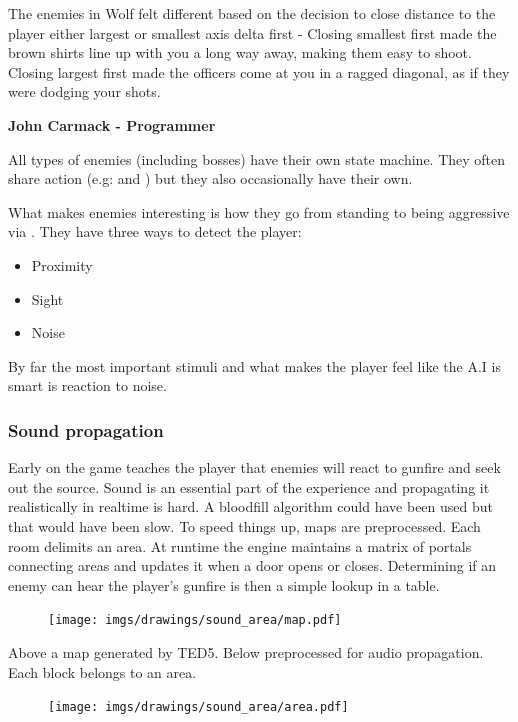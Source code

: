 \begin{fancyquotes}
The enemies in Wolf felt different based on the decision to close distance to the player either largest or smallest axis delta first - Closing smallest first made the brown shirts line up with you a long way away, making them easy to shoot.  Closing largest first made the officers come at you in a ragged diagonal, as if they were dodging your shots.\\
\par
\textbf{John Carmack - Programmer}
 \end{fancyquotes}
\par
All types of enemies (including bosses) have their own state machine. They often share action (e.g:  and ) but they also occasionally have their own.\\
\par
What makes enemies interesting is how they go from standing to being aggressive via . They have three ways to detect the player:
\begin{itemize}
\item Proximity
\item Sight
\item Noise
\end{itemize}
By far the most important stimuli and what makes the player feel like the A.I is smart is reaction to noise.





\subsubsection{Sound propagation}
Early on the game teaches the player that enemies will react to gunfire and seek out the source. Sound is an essential part of the experience and propagating it realistically in realtime is hard. A bloodfill algorithm could have been used but that would have been slow. To speed things up, maps are preprocessed. Each room delimits an area. At runtime the engine maintains a matrix of portals connecting areas and updates it when a door opens or closes. Determining if an enemy can hear the player's gunfire is then a simple lookup in a table.

\par
\begin{figure}[H]
 \centering
 \texttt{[image: imgs/drawings/sound\_area/map.pdf]}
\end{figure}
\par
Above a map generated by TED5. Below preprocessed for audio propagation. Each block belongs to an area.
\par
\begin{figure}[H]
 \centering
 \texttt{[image: imgs/drawings/sound\_area/area.pdf]}
\end{figure}
\par



